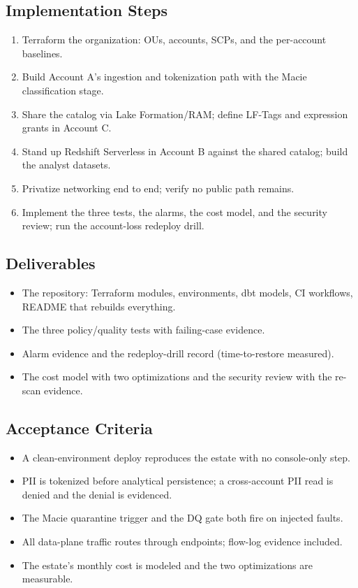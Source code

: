 \subsection*{Implementation Steps}
\begin{enumerate}
    \item Terraform the organization: OUs, accounts, SCPs, and the per-account baselines.
    \item Build Account A's ingestion and tokenization path with the Macie classification stage.
    \item Share the catalog via Lake Formation/RAM; define LF-Tags and expression grants in Account C.
    \item Stand up Redshift Serverless in Account B against the shared catalog; build the analyst datasets.
    \item Privatize networking end to end; verify no public path remains.
    \item Implement the three tests, the alarms, the cost model, and the security review; run the account-loss redeploy drill.
\end{enumerate}

\subsection*{Deliverables}
\begin{itemize}
    \item The repository: Terraform modules, environments, dbt models, CI workflows, README that rebuilds everything.
    \item The three policy/quality tests with failing-case evidence.
    \item Alarm evidence and the redeploy-drill record (time-to-restore measured).
    \item The cost model with two optimizations and the security review with the re-scan evidence.
\end{itemize}

\subsection*{Acceptance Criteria}
\begin{itemize}
    \item A clean-environment deploy reproduces the estate with no console-only step.
    \item PII is tokenized before analytical persistence; a cross-account PII read is denied and the denial is evidenced.
    \item The Macie quarantine trigger and the DQ gate both fire on injected faults.
    \item All data-plane traffic routes through endpoints; flow-log evidence included.
    \item The estate's monthly cost is modeled and the two optimizations are measurable.
\end{itemize}

